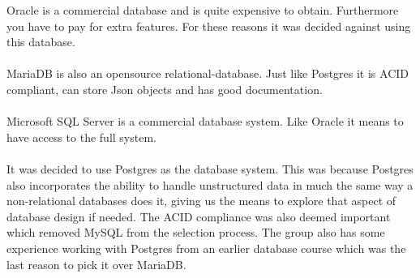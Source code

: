 Oracle is a commercial database and is quite expensive to obtain\cite{oracle}.
Furthermore you have to pay for extra features.
For these reasons it was decided against using this database.
\\
\\
MariaDB is also an opensource relational-database\cite{MariaDB}.
Just like Postgres it is ACID compliant, can store Json objects and has good documentation.
\\
\\
Microsoft SQL Server is a commercial database system\cite{MSSQLSERVER}.
Like Oracle it means to have access to the full system.
\\
\\
It was decided to use Postgres as the database system.
This was because Postgres also incorporates the ability to handle unstructured data in much the same way a non-relational databases does it, giving us the means to explore that aspect of database design if needed.
The ACID compliance was also deemed important which removed MySQL from the selection process. 
The group also has some experience working with Postgres from an earlier database course which was the last reason to pick it over MariaDB.
